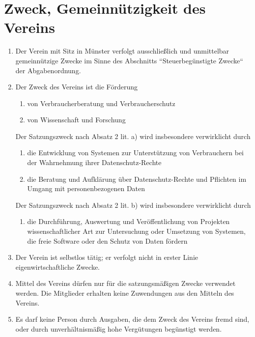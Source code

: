 \section{Zweck, Gemeinnützigkeit des Vereins}
\begin{enumerate}[label=(\arabic*)]
    \item Der Verein mit Sitz in Münster verfolgt ausschließlich und
        unmittelbar gemeinnützige Zwecke im Sinne des Abschnitts
        ``Steuerbegünstigte Zwecke`` der Abgabenordnung.
    \item Der Zweck des Vereins ist die Förderung
        \begin{enumerate}[label=\alph*)]
            \item von Verbraucherberatung und Verbraucherschutz
            \item von Wissenschaft und Forschung 
        \end{enumerate}
        Der Satzungszweck nach Absatz 2 lit. a) wird insbesondere verwirklicht
        durch
        \begin{enumerate}[label=\alph*)]
            \item die Entwicklung von Systemen zur Unterstützung von
                Verbrauchern bei der Wahrnehmung ihrer Datenschutz-Rechte
            \item die Beratung und Aufklärung über Datenschutz-Rechte und
                Pflichten im Umgang mit personenbezogenen Daten
        \end{enumerate}
        Der Satzungszweck nach Absatz 2 lit. b) wird insbesondere verwirklicht
        durch
        \begin{enumerate}[label=\alph*)]
            \item die Durchführung, Auswertung und Veröffentlichung von
                Projekten wissenschaftlicher Art zur Untersuchung oder
                Umsetzung von Systemen, die freie Software oder den Schutz von
                Daten fördern
        \end{enumerate}
    \item Der Verein ist selbstlos tätig; er verfolgt nicht in erster Linie
        eigenwirtschaftliche Zwecke.
    \item Mittel des Vereins dürfen nur für die satzungsmäßigen Zwecke
        verwendet werden. Die Mitglieder erhalten keine Zuwendungen aus den
        Mitteln des Vereins.
    \item Es darf keine Person durch Ausgaben, die dem Zweck des Vereins fremd
        sind, oder durch unverhältnismäßig hohe Vergütungen begünstigt werden.
\end{enumerate}

